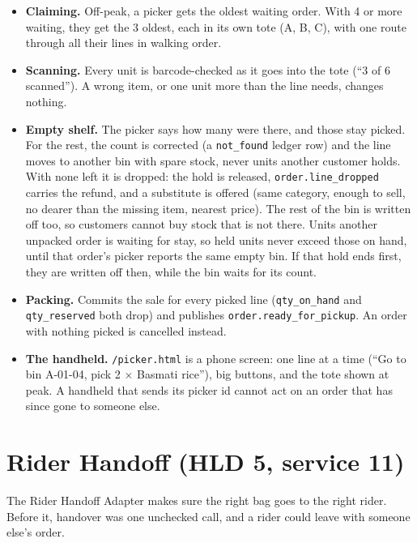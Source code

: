 \begin{itemize}
  \item \textbf{Claiming.} Off-peak, a picker gets the oldest waiting order. With 4 or more waiting, they get the
    3 oldest, each in its own tote (A, B, C), with one route through all their lines in walking order.
  \item \textbf{Scanning.} Every unit is barcode-checked as it goes into the tote (``3 of 6 scanned''). A wrong item,
    or one unit more than the line needs, changes nothing.
  \item \textbf{Empty shelf.} The picker says how many were there, and those stay picked. For the rest, the count is
    corrected (a \texttt{not\_found} ledger row) and the line moves to another bin with spare stock, never units
    another customer holds. With none left it is dropped: the hold is released, \texttt{order.line\_dropped} carries
    the refund, and a substitute is offered (same category, enough to sell, no dearer than the missing item, nearest
    price). The rest of the bin is written off too, so customers cannot buy stock that is not there. Units another
    unpacked order is waiting for stay, so held units never exceed those on hand, until that order's picker reports
    the same empty bin. If that hold ends first, they are written off then, while the bin waits for its count.
  \item \textbf{Packing.} Commits the sale for every picked line (\texttt{qty\_on\_hand} and \texttt{qty\_reserved}
    both drop) and publishes \texttt{order.ready\_for\_pickup}. An order with nothing picked is cancelled instead.
  \item \textbf{The handheld.} \texttt{/picker.html} is a phone screen: one line at a time (``Go to bin A-01-04,
    pick 2 $\times$ Basmati rice''), big buttons, and the tote shown at peak. A handheld that sends its picker id
    cannot act on an order that has since gone to someone else.
\end{itemize}

\section{Rider Handoff (HLD 5, service 11)}

The Rider Handoff Adapter makes sure the right bag goes to the right rider. Before it, handover was one unchecked
call, and a rider could leave with someone else's order.

